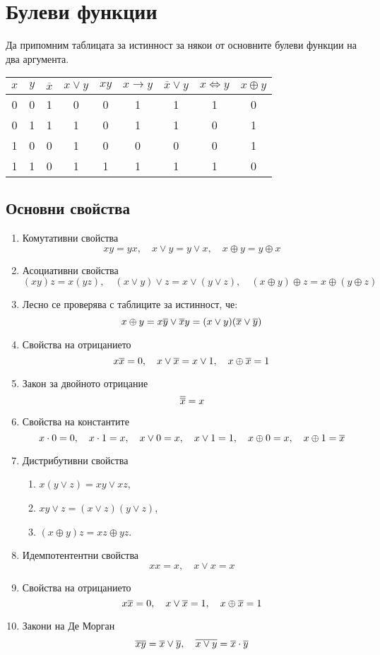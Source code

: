 \chapter{Булеви функции}

Да припомним таблицата за истинност за някои от основните булеви функции на два аргумента.

\begin{tabular}{|c|c|c|c|c|c|c|c|c|}
  \hline
  $x$ & $y$ & $\overline{x}$ & $x \vee y$ & $xy$ & $x \rightarrow y$ & $\overline{x}\vee y$ & $x \iff y$ & $x \oplus y$\\
  \hline
  0 & 0 & 1 & 0 & 0 & 1 & 1 & 1 & 0\\
  \hline
  0 & 1 & 1 & 1 & 0 & 1 & 1 & 0 & 1\\
  \hline
  1 & 0 & 0 & 1 & 0 & 0 & 0 & 0 & 1\\
  \hline
  1 & 1 & 0 & 1 & 1 & 1 & 1 & 1 & 0\\
  \hline
\end{tabular}

\section{Основни свойства}

\begin{enumerate}[1)]%
\item
  Комутативни свойства
  \[xy = yx,\quad x\vee y = y\vee x,\quad x\oplus y = y\oplus x\]
\item
  Асоциативни свойства
  \[(xy)z = x(yz),\quad (x\vee y)\vee z = x\vee (y\vee z),\quad (x\oplus y)\oplus z = x\oplus (y\oplus z)\]
\item
  Лесно се проверява с таблиците за истинност, че:
  \[x\oplus y = x\overline{y}\vee \overline{x}y = (x\vee y)(\overline{x}\vee\overline{y})\]
\item
  Свойства на отрицанието
  \[x\overline{x} = 0, \quad x\vee\overline{x} = x\vee 1,\quad x\oplus\overline{x} = 1\]
\item
  Закон за двойното отрицание
  \[\overline{\overline{x}} = x\]
\item
  Свойства на константите
  \[x\cdot 0 = 0, \quad x\cdot 1 = x,\quad x\vee 0 = x,\quad x\vee 1 = 1,\quad x\oplus 0 = x, \quad x\oplus 1 = \overline{x}\]
\item
  Дистрибутивни свойства
  \begin{enumerate}[]
  \item
    $x(y\vee z) = xy \vee xz$,
  \item
    $xy \vee z = (x\vee z)(y\vee z)$,
  \item
    $(x\oplus y)z = xz \oplus yz$.
  \end{enumerate}
\item
  Идемпотентентни свойства
  \[xx = x, \quad x\vee x = x\]
\item
  Свойства на отрицанието
  \[x\overline{x} = 0, \quad x\vee\overline{x} = 1, \quad x\oplus\overline{x} = 1\]
\item
  Закони на Де Морган
  \[\overline{xy} = \overline{x}\vee\overline{y}, \quad \overline{x\vee y} = \overline{x}\cdot\overline{y}\]
\end{enumerate}

